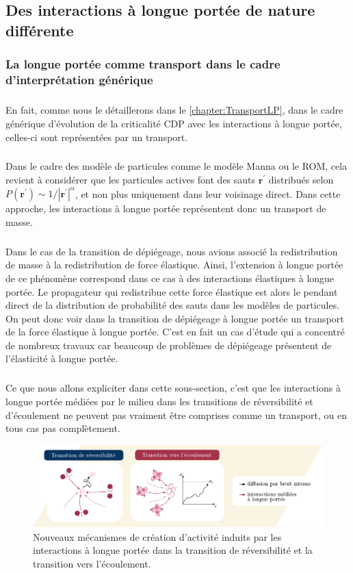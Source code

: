 \subsection{Des interactions à longue portée de nature différente}

\subsubsection{La longue portée comme transport dans le cadre d'interprétation générique}

\subparagraph{}En fait, comme nous le détaillerons dans le \autoref{chapter:TransportLP}, dans le cadre générique d'évolution de la criticalité CDP avec les interactions à longue portée, celles-ci sont représentées par un transport.

\subparagraph{}Dans le cadre des modèle de particules comme le modèle Manna ou le ROM, cela revient à considérer que les particules actives font des sauts $\mathbf{r}^\prime$ distribués selon $P(\mathbf{r}^\prime)\sim 1/|\mathbf{r}^{\prime}|^{\alpha}$, et non plus uniquement dans leur voisinage direct. Dans cette approche, les interactions à longue portée représentent donc un transport de masse.

\subparagraph{}Dans le cas de la transition de dépiégeage, nous avions associé la redistribution de masse à la redistribution de force élastique. Ainsi, l'extension à longue portée de ce phénomène correspond dans ce cas à des interactions élastiques à longue portée. Le propagateur qui redistribue cette force élastique est alors le pendant direct de la distribution de probabilité des sauts dans les modèles de particules. On peut donc voir dans la transition de dépiégeage à longue portée un transport de la force élastique à longue portée. C'est en fait un cas d'étude qui a concentré de nombreux travaux car beaucoup de problèmes de dépiégeage présentent de l'élasticité à longue portée.


\subparagraph{}Ce que nous allons expliciter dans cette sous-section, c'est que les interactions à longue portée médiées par le milieu dans les transitions de réversibilité et d'écoulement ne peuvent pas vraiment être comprises comme un transport, ou en tous cas pas complètement.

\begin{figure}[h]
	\centering
	\includegraphics[width=\textwidth]{Chapitre1/Figures/Pb/bruit.pdf}
	\caption{Nouveaux mécanismes de création d'activité induits par les interactions à longue portée dans la transition de réversibilité et la transition vers l'écoulement. }
	\label{fig:bruit}
\end{figure}

